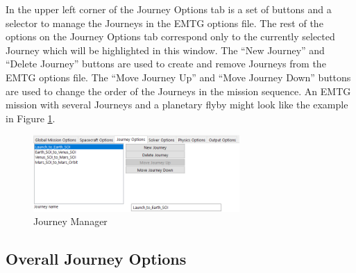 \noindent In the upper left corner of the Journey Options tab is a set of buttons and a selector to manage the Journeys in the \ac{EMTG} options file. The rest of the options on the Journey Options tab correspond only to the currently selected Journey which will be highlighted in this window. The ``New Journey'' and ``Delete Journey'' buttons are used to create and remove Journeys from the \ac{EMTG} options file. The ``Move Journey Up'' and ``Move Journey Down'' buttons are used to change the order of the Journeys in the mission sequence. An \ac{EMTG} mission with several Journeys and a planetary flyby might look like the example in Figure \ref{fig:pyemtg_journey_manager}.

    \begin{figure}[H]
        \centering
        \includegraphics[width=0.7\textwidth]{../../shared_latex_inputs/images/pyemtg_journey_window.png}
        \caption{Journey Manager}
        \label{fig:pyemtg_journey_manager}
    \end{figure}

\subsection{Overall Journey Options}

